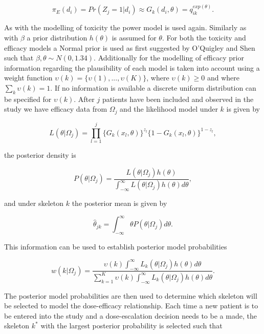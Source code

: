 \begin{equation}
\pi_E(d_i) = Pr(Z_j = 1|d_i) \approx G_k(d_i,\theta) = q_{ik} ^{exp(\theta)}.
\end{equation}

As with the modelling of toxicity the power model is used again. Similarly as with $\beta$ a prior distribution $h(\theta)$ is assumed for $\theta$. For both the toxicity and efficacy models a Normal prior is used as first suggested by O'Quigley and Shen \cite{oquigleyContinualReassessmentMethod1996} such that $\beta, \theta \sim N(0,1.34)$. Additionally for the modelling of efficacy prior information regarding the plausibility of each model is taken into account using a weight function $\upsilon(k) = \{\upsilon(1), ..., \upsilon(K)\}$, where $\upsilon(k) \geq 0$ and where $\sum_k \upsilon(k) = 1$. If no information is available a discrete uniform distribution can be specified for $\upsilon(k)$. After $j$ patients have been included and observed in the study we have efficacy data from $\Omega_j$ and the likelihood model under $k$ is given by 

\begin{equation}
L(\theta|\Omega_j)=\prod_{l=1}^{j}\{G_k(x_l,\theta)\}^{z_l}\{1-G_k(x_l,\theta)\}^{1-z_l},  
\end{equation}

the posterior density is 

\begin{equation}
P(\theta|\Omega_j) = \frac{L(\theta|\Omega_j)h(\theta)}{\int_{-\infty}^{\infty}L(\theta|\Omega_j)h(\theta)d\theta},
\end{equation}

and under skeleton $k$ the posterior mean is given by 

\begin{equation}
\hat{\theta}_{jk} = \int_{-\infty}^{\infty}\theta P(\theta|\Omega_j)d\theta.
\end{equation} 

This information can be used to establish posterior model probabilities 

\begin{equation}
w(k|\Omega_j) = \frac{\upsilon(k)\int_{-\infty}^{\infty}L_k(\theta|\Omega_j)h(\theta)d\theta}{\sum_{k=1}^{K}\upsilon(k)\int_{-\infty}^{\infty}L_k(\theta|\Omega_j)h(\theta)d\theta}.
\end{equation}

The posterior model probabilities are then used to determine which skeleton will be selected to model the dose-efficacy relationship. Each time a new patient is to be entered into the study and a dose-escalation decision needs to be a made, the skeleton $k^*$ with the largest posterior probability is selected such that


